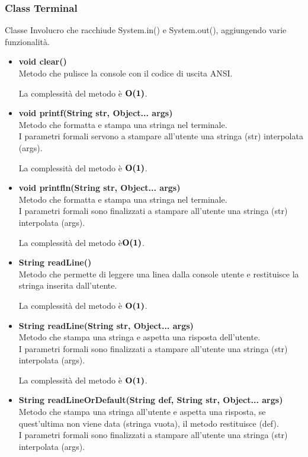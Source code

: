 \documentclass[a4paper, 12pt]{scrreprt}
\begin{document}
				\subsubsection{Class Terminal}
				Classe Involucro che racchiude System.in() e System.out(), aggiungendo varie funzionalit\`a.
				\begin{itemize}
					\item \textbf{void clear()}
					\\Metodo che pulisce la console con il codice di uscita ANSI.
					
					La complessit\`a del metodo \`e $\mathbf{O}\textbf{(1)}$.
					
					\item \textbf{void printf(String str, Object... args)}
					\\Metodo che formatta e stampa una stringa nel terminale.
					\\I parametri formali servono a stampare all'utente una stringa (str) interpolata (args).
					
					La complessit\`a del metodo \`e $\mathbf{O}\textbf{(1)}$.
					
					\item \textbf{void printfln(String str, Object... args)}
					\\Metodo che formatta e stampa una stringa nel terminale.
					\\I parametri formali sono finalizzati a stampare all'utente una stringa (str) interpolata (args).
					
					La complessit\`a del metodo \`e$\mathbf{O}\textbf{(1)}$.
					
					\item \textbf{String readLine()}
					\\Metodo che permette di leggere una linea dalla console utente e restituisce la stringa inserita dall'utente.
					
					La complessit\`a del metodo \`e $\mathbf{O}\textbf{(1)}$.
					
					\item \textbf{String readLine(String str, Object... args)}
					\\Metodo che stampa una stringa e aspetta una risposta dell'utente.
					\\I parametri formali sono finalizzati a stampare all'utente una stringa (str) interpolata (args).
					
					La complessit\`a del metodo \`e $\mathbf{O}\textbf{(1)}$.
					
					\item \textbf{String readLineOrDefault(String def, String str, Object... args)}
					\\Metodo che stampa una stringa all'utente e aspetta una risposta, se quest'ultima non viene data (stringa vuota), il metodo restituisce (def).
					\\I parametri formali sono finalizzati a stampare all'utente una stringa (str) interpolata (args).
					

\end{itemize}
\end{document}
